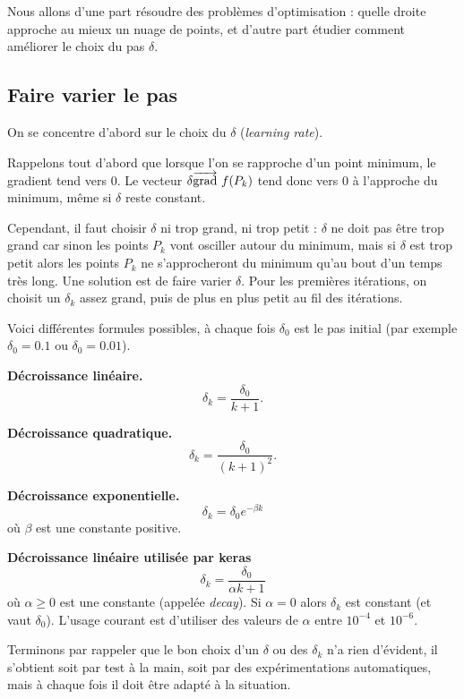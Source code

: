 Nous allons d'une part résoudre des problèmes d'optimisation : quelle droite approche au mieux un nuage de points, et d'autre part étudier comment améliorer le choix du pas $\delta$.


\subsection{Faire varier le pas}

On se concentre d'abord sur le choix du   $\delta$ (\emph{learning rate}).

Rappelons tout d'abord que lorsque l'on se rapproche d'un point minimum, le gradient tend vers $0$. Le vecteur $\delta \overrightarrow{\textup{grad}}\  f(P_k)$ tend donc vers $0$ à l'approche du minimum, même si $\delta$ reste constant.

Cependant, il faut choisir $\delta$ ni trop grand, ni trop petit : $\delta$ ne doit pas être trop grand car sinon les points $P_k$ vont osciller autour du minimum, mais si $\delta$ est trop petit alors les points $P_k$ ne s'approcheront du minimum qu'au bout d'un temps très long. Une solution est de faire varier $\delta$. Pour les premières itérations, on choisit un $\delta_k$ assez grand, puis de plus en plus petit au fil des itérations.

Voici différentes formules possibles, à chaque fois $\delta_0$ est le pas initial (par exemple $\delta_0=0.1$ ou $\delta_0=0.01$).

\textbf{Décroissance linéaire.}
$$\delta_k = \frac{\delta_0}{k+1}.$$

\textbf{Décroissance quadratique.}
$$\delta_k = \frac{\delta_0}{(k+1)^2}.$$

\textbf{Décroissance exponentielle.}
$$\delta_k = \delta_0 e^{-\beta k}$$
où $\beta$ est une constante positive.


\textbf{Décroissance linéaire utilisée par keras}
$$\delta_k = \frac{\delta_0}{\alpha k+1}$$
où $\alpha\ge0$ est une constante (appelée \emph{decay}).
Si $\alpha=0$ alors $\delta_k$ est constant (et vaut $\delta_0$).
L'usage courant est d'utiliser des valeurs de $\alpha$ entre $10^{-4}$ et $10^{-6}$.


Terminons par rappeler que le bon choix d'un $\delta$ ou des $\delta_k$ n'a rien d'évident, il s'obtient soit par test à la main, soit par des expérimentations automatiques, mais à chaque fois il doit être adapté à la situation.



